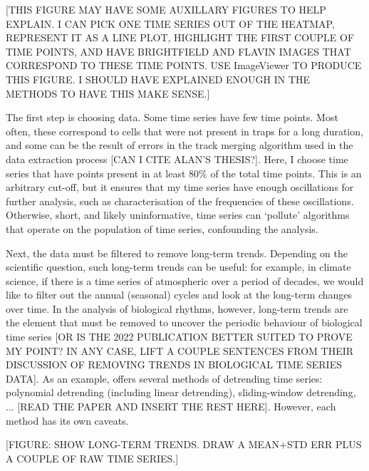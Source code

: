 [THIS FIGURE MAY HAVE SOME AUXILLARY FIGURES TO HELP EXPLAIN.  I CAN PICK ONE TIME SERIES OUT OF THE HEATMAP, REPRESENT IT AS A LINE PLOT, HIGHLIGHT THE FIRST COUPLE OF TIME POINTS, AND HAVE BRIGHTFIELD AND FLAVIN IMAGES THAT CORRESPOND TO THESE TIME POINTS.  USE ImageViewer TO PRODUCE THIS FIGURE.  I SHOULD HAVE EXPLAINED ENOUGH IN THE METHODS TO HAVE THIS MAKE SENSE.]

The first step is choosing data.
Some time series have few time points.
Most often, these correspond to cells that were not present in traps for a long duration, and some can be the result of errors in the track merging algorithm used in the data extraction process [CAN I CITE ALAN'S THESIS?].
Here, I choose time series that have points present in at least 80\% of the total time points.
This is an arbitrary cut-off, but it ensures that my time series have enough oscillations for further analysis, such as characterisation of the frequencies of these oscillations.
Otherwise, short, and likely uninformative, time series can `pollute' algorithms that operate on the population of time series, confounding the analysis.

Next, the data must be filtered to remove long-term trends.
Depending on the scientific question, such long-term trends can be useful:
for example, in climate science, if there is a time series of atmospheric  over a period of decades, we would like to filter out the annual (seasonal) cycles and look at the long-term changes over time.
In the analysis of biological rhythms, however, long-term trends are the element that must be removed to uncover the periodic behaviour of biological time series \parencite{zielinskiStrengthsLimitationsPeriod2014} [OR IS THE 2022 PUBLICATION BETTER SUITED TO PROVE MY POINT?  IN ANY CASE, LIFT A COUPLE SENTENCES FROM THEIR DISCUSSION OF REMOVING TRENDS IN BIOLOGICAL TIME SERIES DATA].
As an example, \textcite{zielinskiPeriodEstimationRhythm2022} offers several methods of detrending time series: polynomial detrending (including linear detrending), sliding-window detrending, ... [READ THE PAPER AND INSERT THE REST HERE].
However, each method has its own caveats.

[FIGURE: SHOW LONG-TERM TRENDS.  DRAW A MEAN+STD ERR PLUS A COUPLE OF RAW TIME SERIES.]

